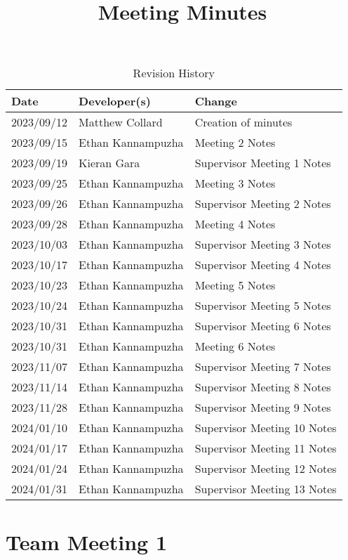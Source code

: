 \documentclass{article}
\title{Meeting Minutes\\\progname}
\author{\authname}
\date{}
\begin{document}
\maketitle

\begin{table}[hp]
\caption{Revision History} \label{TblRevisionHistory}
\begin{tabularx}{\textwidth}{llX}
\toprule
\textbf{Date} & \textbf{Developer(s)} & \textbf{Change}\\
\midrule
2023/09/12 & Matthew Collard & Creation of minutes\\
2023/09/15 & Ethan Kannampuzha & Meeting 2 Notes\\
2023/09/19 & Kieran Gara & Supervisor Meeting 1 Notes\\
2023/09/25 & Ethan Kannampuzha & Meeting 3 Notes\\
2023/09/26 & Ethan Kannampuzha & Supervisor Meeting 2 Notes\\
2023/09/28 & Ethan Kannampuzha & Meeting 4 Notes\\
2023/10/03 & Ethan Kannampuzha & Supervisor Meeting 3 Notes\\
2023/10/17 & Ethan Kannampuzha & Supervisor Meeting 4 Notes\\
2023/10/23 & Ethan Kannampuzha & Meeting 5 Notes\\
2023/10/24 & Ethan Kannampuzha & Supervisor Meeting 5 Notes\\
2023/10/31 & Ethan Kannampuzha & Supervisor Meeting 6 Notes\\
2023/10/31 & Ethan Kannampuzha & Meeting 6 Notes\\
2023/11/07 & Ethan Kannampuzha & Supervisor Meeting 7 Notes\\
2023/11/14 & Ethan Kannampuzha & Supervisor Meeting 8 Notes\\
2023/11/28 & Ethan Kannampuzha & Supervisor Meeting 9 Notes\\
2024/01/10 & Ethan Kannampuzha & Supervisor Meeting 10 Notes\\
2024/01/17 & Ethan Kannampuzha & Supervisor Meeting 11 Notes\\
2024/01/24 & Ethan Kannampuzha & Supervisor Meeting 12 Notes\\
2024/01/31 & Ethan Kannampuzha & Supervisor Meeting 13 Notes\\
\bottomrule
\end{tabularx}
\end{table}

\pagebreak
\section*{Team Meeting 1}
\end{document}
